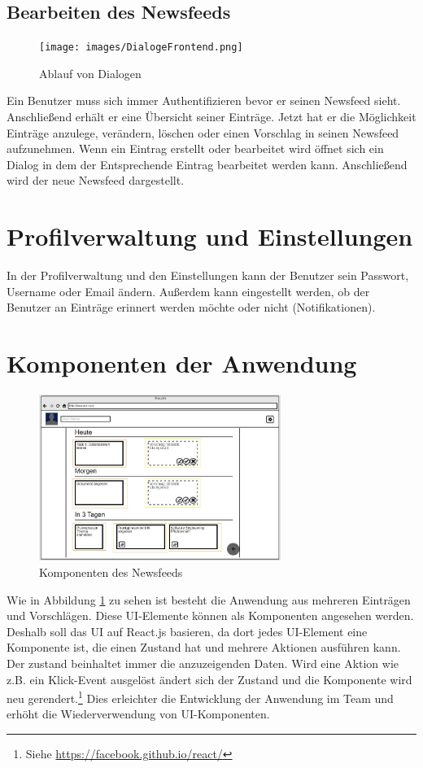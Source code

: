 \subsection{Bearbeiten des Newsfeeds}
\begin{figure}[H]
    \centering
    \texttt{[image: images/DialogeFrontend.png]}
    \caption{Ablauf von Dialogen}
\end{figure}

Ein Benutzer muss sich immer Authentifizieren bevor er seinen Newsfeed sieht.
Anschließend erhält er eine Übersicht seiner Einträge. Jetzt hat er die Möglichkeit Einträge anzulege, verändern, löschen oder einen
Vorschlag in seinen Newsfeed aufzunehmen.
Wenn ein Eintrag erstellt oder bearbeitet wird öffnet sich ein Dialog in dem der Entsprechende Eintrag bearbeitet werden kann.
Anschließend wird der neue Newsfeed dargestellt.

\section{Profilverwaltung und Einstellungen}
In der Profilverwaltung und den Einstellungen  kann der Benutzer sein Passwort, Username oder Email ändern. 
Außerdem kann eingestellt werden, ob der Benutzer an Einträge erinnert werden möchte oder nicht (Notifikationen).



\section{Komponenten der Anwendung}
\begin{figure}[H]\label{frontend:mockup}
    \centering
    \includegraphics[width=0.7\textwidth]{images/mock-up.JPG}
    \caption{Komponenten des Newsfeeds}
\end{figure}

Wie in Abbildung \ref{frontend:mockup} zu sehen ist besteht die Anwendung aus mehreren Einträgen und Vorschlägen.
Diese UI-Elemente können als Komponenten angesehen werden.  
Deshalb soll das UI auf React.js basieren, da dort jedes UI-Element eine Komponente ist, die einen Zustand hat und mehrere Aktionen ausführen kann.
Der zustand beinhaltet immer die anzuzeigenden Daten. Wird eine Aktion wie z.B. ein Klick-Event ausgelöst ändert sich der Zustand und die Komponente wird
neu gerendert.\footnote{Siehe \url{https://facebook.github.io/react/}}
Dies erleichter die Entwicklung der Anwendung im Team und erhöht die Wiederverwendung von UI-Komponenten.

